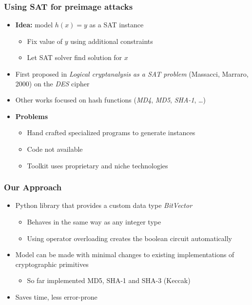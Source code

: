 \documentclass{beamer}
\let\olditem\item
\renewcommand{\item}{%
\olditem\vspace{4pt}}
\begin{document}
\begin{frame}
\frametitle{Using SAT for preimage attacks}
\begin{itemize}
\item \textbf{Idea:} model $h(x) = y$ as a SAT instance
\begin{itemize}
	\item Fix value of $y$ using additional constraints
	\item Let SAT solver find solution for $x$
\end{itemize}
\item First proposed in \emph{Logical cryptanalysis as a SAT problem} (Massacci, Marraro, 2000) on the \emph{DES} cipher
\item Other works focused on hash functions (\emph{MD4}, \emph{MD5}, \emph{SHA-1}, \dots)
\item \textbf{Problems}
\begin{itemize}
	\item Hand crafted specialized programs to generate instances
	\item Code not available
	\item Toolkit uses proprietary and niche technologies
\end{itemize}
\end{itemize}
\end{frame}

\begin{frame}
\frametitle{Our Approach}
\begin{itemize}
\item Python library that provides a custom data type \textit{BitVector}
\begin{itemize}
	\item Behaves in the same way as any integer type
	\item Using operator overloading creates the boolean circuit automatically
\end{itemize}
\item Model can be made with minimal changes to existing implementations of cryptographic primitives
\begin{itemize}
	\item So far implemented MD5, SHA-1 and SHA-3 (Keccak)
\end{itemize}
\item Saves time, less error-prone
\end{itemize}
\end{frame}
\end{document}
